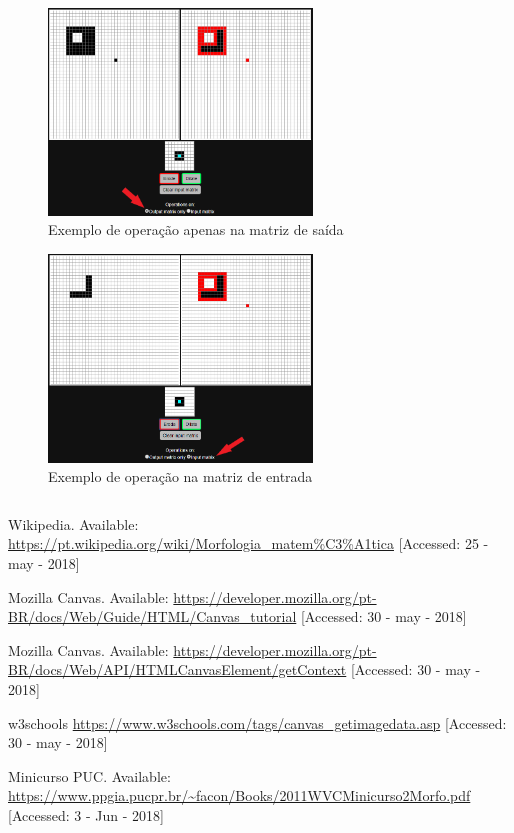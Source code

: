 \documentclass[conference,harvard,brazil,english]{sbatex}
\begin{document}
\begin{figure}[htp]
	\centering
	\includegraphics[width=7cm]{op_saida.png}
	\caption{Exemplo de operação apenas na matriz de saída}
	\label{op_saida}
\end{figure}

\begin{figure}[htp]
	\centering
	\includegraphics[width=7cm]{op_entrada.png}
	\caption{Exemplo de operação na matriz de entrada}
	\label{op_entrada}
\end{figure}


\begin{lstlisting}

\end{lstlisting}

\pagebreak
\begin{thebibliography}{99}

 Wikipedia. Available: \url{https://pt.wikipedia.org/wiki/Morfologia_matem%C3%A1tica} [Accessed: 25 - may - 2018]

 Mozilla Canvas. Available: \url{https://developer.mozilla.org/pt-BR/docs/Web/Guide/HTML/Canvas\_tutorial} [Accessed: 30 - may - 2018]

 Mozilla Canvas. Available: \url{https://developer.mozilla.org/pt-BR/docs/Web/API/HTMLCanvasElement/getContext} [Accessed: 30 - may - 2018]

 w3schools \url{https://www.w3schools.com/tags/canvas_getimagedata.asp} [Accessed: 30 - may - 2018]

 Minicurso PUC. Available: \url{https://www.ppgia.pucpr.br/~facon/Books/2011WVCMinicurso2Morfo.pdf} [Accessed: 3 - Jun - 2018]

\end{thebibliography}
\end{document}
